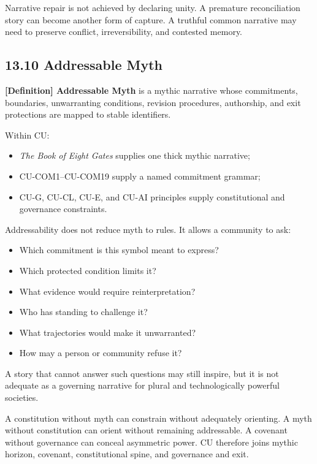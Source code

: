 \documentclass[
  11pt,
]{article}
\providecommand{\tightlist}{%
  \setlength{\itemsep}{0pt}\setlength{\parskip}{0pt}}
\begin{document}
Narrative repair is not achieved by declaring unity. A premature
reconciliation story can become another form of capture. A truthful
common narrative may need to preserve conflict, irreversibility, and
contested memory.

\subsection{13.10 Addressable Myth}\label{addressable-myth}

\textbf{{[}Definition{]} Addressable Myth} is a mythic narrative whose
commitments, boundaries, unwarranting conditions, revision procedures,
authorship, and exit protections are mapped to stable identifiers.

Within CU:

\begin{itemize}
\tightlist
\item
  \emph{The Book of Eight Gates} supplies one thick mythic narrative;
\item
  CU-COM1--CU-COM19 supply a named commitment grammar;
\item
  CU-G, CU-CL, CU-E, and CU-AI principles supply constitutional and
  governance constraints.
\end{itemize}

Addressability does not reduce myth to rules. It allows a community to
ask:

\begin{itemize}
\tightlist
\item
  Which commitment is this symbol meant to express?
\item
  Which protected condition limits it?
\item
  What evidence would require reinterpretation?
\item
  Who has standing to challenge it?
\item
  What trajectories would make it unwarranted?
\item
  How may a person or community refuse it?
\end{itemize}

A story that cannot answer such questions may still inspire, but it is
not adequate as a governing narrative for plural and technologically
powerful societies.

A constitution without myth can constrain without adequately orienting.
A myth without constitution can orient without remaining addressable. A
covenant without governance can conceal asymmetric power. CU therefore
joins mythic horizon, covenant, constitutional spine, and governance and
exit.
\end{document}
